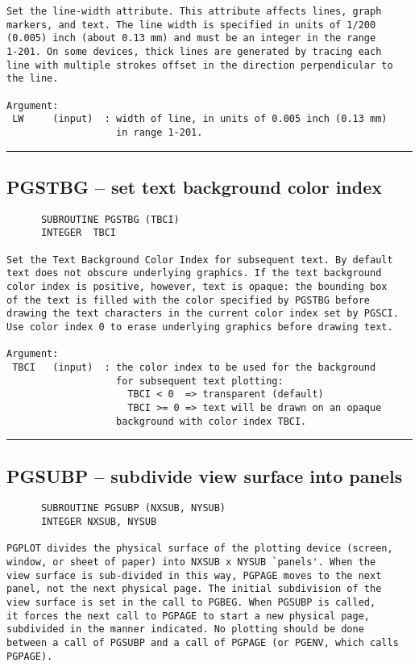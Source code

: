 {\begin{verbatim}
Set the line-width attribute. This attribute affects lines, graph
markers, and text. The line width is specified in units of 1/200 
(0.005) inch (about 0.13 mm) and must be an integer in the range
1-201. On some devices, thick lines are generated by tracing each
line with multiple strokes offset in the direction perpendicular to
the line.

Argument:
 LW     (input)  : width of line, in units of 0.005 inch (0.13 mm)
                   in range 1-201.
\end{verbatim}
\hrule


\subsection*{PGSTBG -- set text background color index }
\begin{verbatim}
      SUBROUTINE PGSTBG (TBCI)
      INTEGER  TBCI

Set the Text Background Color Index for subsequent text. By default
text does not obscure underlying graphics. If the text background
color index is positive, however, text is opaque: the bounding box
of the text is filled with the color specified by PGSTBG before
drawing the text characters in the current color index set by PGSCI.
Use color index 0 to erase underlying graphics before drawing text.

Argument:
 TBCI   (input)  : the color index to be used for the background
                   for subsequent text plotting:
                     TBCI < 0  => transparent (default)
                     TBCI >= 0 => text will be drawn on an opaque
                   background with color index TBCI.
\end{verbatim}
\hrule


\subsection*{PGSUBP -- subdivide view surface into panels }
\begin{verbatim}
      SUBROUTINE PGSUBP (NXSUB, NYSUB)
      INTEGER NXSUB, NYSUB

PGPLOT divides the physical surface of the plotting device (screen,
window, or sheet of paper) into NXSUB x NYSUB `panels'. When the 
view surface is sub-divided in this way, PGPAGE moves to the next
panel, not the next physical page. The initial subdivision of the
view surface is set in the call to PGBEG. When PGSUBP is called,
it forces the next call to PGPAGE to start a new physical page,
subdivided in the manner indicated. No plotting should be done
between a call of PGSUBP and a call of PGPAGE (or PGENV, which calls
PGPAGE).


\end{verbatim}}
